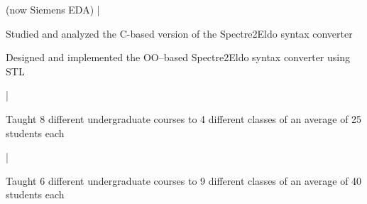 
 (now Siemens EDA) |
\begin{tightemize}
\item{Studied and analyzed the C-based version of the Spectre2Eldo syntax converter}
\item{Designed and implemented the OO--based Spectre2Eldo syntax converter using STL}
\end{tightemize}
\sectionsep

 |
\begin{tightemize}
\item{Taught 8 different undergraduate courses to 4 different classes of an average of 25 students each}
\end{tightemize}
\sectionsep

 |
\begin{tightemize}
\item{Taught 6 different undergraduate courses to 9 different classes of an average of 40 students each}
\end{tightemize}
\sectionsep

